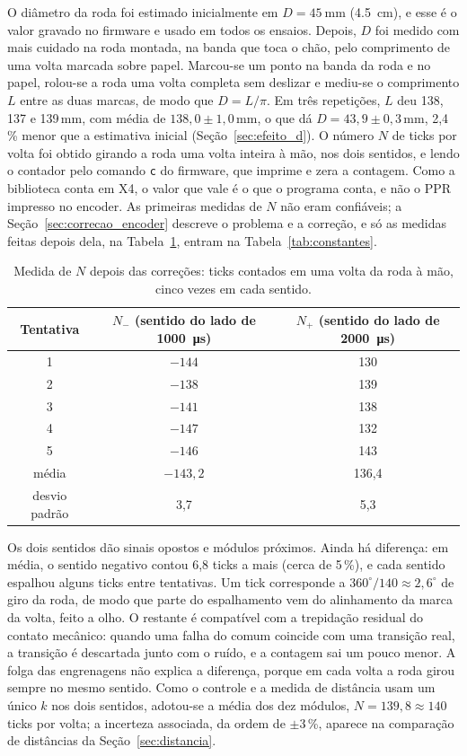 \documentclass[12pt]{article}
\begin{document}
O diâmetro da roda foi estimado inicialmente em $D = \SI{45}{\milli\meter}$ (\SI{4,5}{\centi\meter}), e esse é o valor gravado no firmware e usado em todos os ensaios. Depois, $D$ foi medido com mais cuidado na roda montada, na banda que toca o chão, pelo comprimento de uma volta marcada sobre papel. Marcou-se um ponto na banda da roda e no papel, rolou-se a roda uma volta completa sem deslizar e mediu-se o comprimento $L$ entre as duas marcas, de modo que $D = L/\pi$. Em três repetições, $L$ deu 138, 137 e 139\,mm, com média de $138{,}0 \pm 1{,}0$\,mm, o que dá $D = 43{,}9 \pm 0{,}3$\,mm, 2,4\,\% menor que a estimativa inicial (Seção~\ref{sec:efeito_d}). O número $N$ de ticks por volta foi obtido girando a roda uma volta inteira à mão, nos dois sentidos, e lendo o contador pelo comando \texttt{c} do firmware, que imprime e zera a contagem. Como a biblioteca conta em X4, o valor que vale é o que o programa conta, e não o PPR impresso no encoder. As primeiras medidas de $N$ não eram confiáveis; a Seção~\ref{sec:correcao_encoder} descreve o problema e a correção, e só as medidas feitas depois dela, na Tabela~\ref{tab:n_final}, entram na Tabela~\ref{tab:constantes}.

\begin{table}[H]
  \centering
  \caption{Medida de $N$ depois das correções: ticks contados em uma volta da roda à mão, cinco vezes em cada sentido.}
  \label{tab:n_final}
  \begin{tabular}{ccc}
    \toprule
    Tentativa & $N_-$ (sentido do lado de \SI{1000}{\micro\second}) & $N_+$ (sentido do lado de \SI{2000}{\micro\second}) \\
    \midrule
    1 & $-144$ & 130 \\
    2 & $-138$ & 139 \\
    3 & $-141$ & 138 \\
    4 & $-147$ & 132 \\
    5 & $-146$ & 143 \\
    \midrule
    média & $-143{,}2$ & 136,4 \\
    desvio padrão & 3,7 & 5,3 \\
    \bottomrule
  \end{tabular}
\end{table}

Os dois sentidos dão sinais opostos e módulos próximos. Ainda há diferença: em média, o sentido negativo contou 6,8 ticks a mais (cerca de 5\,\%), e cada sentido espalhou alguns ticks entre tentativas. Um tick corresponde a $360^\circ/140 \approx 2{,}6^\circ$ de giro da roda, de modo que parte do espalhamento vem do alinhamento da marca da volta, feito a olho. O restante é compatível com a trepidação residual do contato mecânico: quando uma falha do comum coincide com uma transição real, a transição é descartada junto com o ruído, e a contagem sai um pouco menor. A folga das engrenagens não explica a diferença, porque em cada volta a roda girou sempre no mesmo sentido. Como o controle e a medida de distância usam um único $k$ nos dois sentidos, adotou-se a média dos dez módulos, $N = 139{,}8 \approx 140$ ticks por volta; a incerteza associada, da ordem de $\pm 3$\,\%, aparece na comparação de distâncias da Seção~\ref{sec:distancia}.
\end{document}
